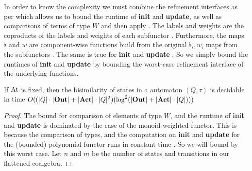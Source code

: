 \documentclass[a4paper,UKenglish,cleveref, autoref, thm-restate]{lipics-v2021}
\newcommand{\Out}{\textbf{\upshape{Out}}}
\newcommand{\Act}{\textbf{\upshape{Act}}}
\newcommand{\At}{\text{\upshape{At}}}
\newcommand{\wgkat}{\textsf{\upshape{wGKAT}}\xspace}
\theoremstyle{plain}\newtheoremrep{thm}{Theorem}[section]
\begin{document}
\begin{toappendix}
		In order to know the complexity we must combine the refinement interfaces as per \cite[8.18]{wissmann2020efficient} which allows us to bound the runtime of \textbf{init} and \textbf{update}, as well as comparisons of terms of type $W$ and then apply \cite[Theorem 3.4]{10.1007/978-3-030-30942-8_18}. The labels and weights are the coproducts of the labels and weights of each subfunctor \cite[8.18]{wissmann2020efficient}. Furthermore, the maps $\flat$ and $w$ are component-wise functions build from the original $\flat_i, w_i$ maps from the subfunctors \cite[8.18]{wissmann2020efficient}. The same is true for \textbf{init} and \textbf{update} \cite[8.18]{wissmann2020efficient}. So we simply bound the runtimes of \textbf{init} and \textbf{update} by bounding the worst-case refinement interface of the underlying functions.
		
		\begin{thm}
			If $\At$ is fixed, then the bisimilarity of states in a \wgkat automaton $(Q, \tau)$ is decidable in time $O((|Q|\cdot|\Out|+|\Act|\cdot|Q|^2)(\log^2(|\Out|+|\Act|\cdot|Q|)))$  \label{runtimeThm}
		\end{thm}
		\begin{proof}
			The bound for comparison of elements of type $W$, and the runtime of \textbf{init} and \textbf{update} is dominated by the case of the monoid weighted functor. This is because the comparison of types, and the computation on \textbf{init} and \textbf{update} for the (bounded) polynomial functor runs in constant time \cite[Example 6.11]{wissmann2020efficient}. So we will bound by this worst case. Let $n$ and $m$ be the number of states and transitions in our flattened coalgebra.
			

\end{proof}
\end{toappendix}
\end{document}
